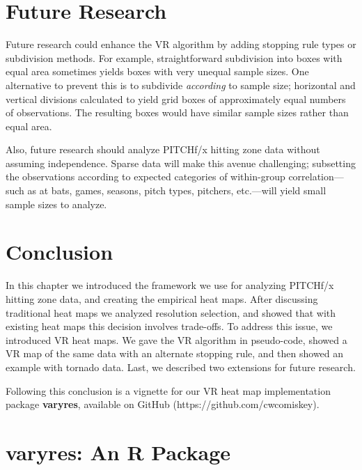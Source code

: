 \section{Future Research} \label{fr}

Future research could enhance the VR algorithm by adding stopping rule types or subdivision methods. For example, straightforward subdivision into boxes with equal area sometimes yields boxes with very unequal sample sizes. One alternative to prevent this is to subdivide {\it according} to sample size; horizontal and vertical divisions calculated to yield grid boxes of approximately equal numbers of observations. The resulting boxes would have similar sample sizes rather than equal area.

Also, future research should analyze PITCHf/x\textsuperscript{\textregistered} hitting zone data without assuming independence. Sparse data will make this avenue challenging; subsetting the observations according to expected categories of within-group correlation---such as at bats, games, seasons, pitch types, pitchers, etc.---will yield small sample sizes to analyze.

\section{Conclusion}

In this chapter we introduced the framework we use for analyzing PITCHf/x\textsuperscript{\textregistered} hitting zone data, and creating the empirical heat maps. After discussing traditional heat maps we analyzed resolution selection, and showed that with existing heat maps this decision involves trade-offs. To address this issue, we introduced VR heat maps. We gave the VR algorithm in pseudo-code, showed a VR map of the same data with an alternate stopping rule, and then showed an example with tornado data. Last, we described two extensions for future research. 

Following this conclusion is a vignette for our VR heat map implementation package {\bf varyres}, available on GitHub (https://github.com/cwcomiskey). 

\section{varyres: An R Package}


